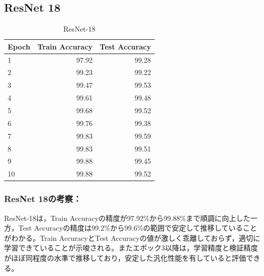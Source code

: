 \documentclass[a4paper,11pt,titlepage]{jsarticle}
\begin{document}
\subsection{ResNet 18}
\begin{table}[H]
\centering
\caption{ResNet-18}
\label{tab:ResNet18}
\begin{tabular}{lrr}
\hline
 Epoch &  Train Accuracy &  Test Accuracy \\
\hline
     1 &           97.92 &                99.28 \\
     2 &           99.23 &                99.22 \\
     3 &           99.47 &                99.53 \\
     4 &           99.61 &                99.48 \\
     5 &           99.68 &                99.52 \\
     6 &           99.76 &                99.38 \\
     7 &           99.83 &                99.59 \\
     8 &           99.83 &                99.51 \\
     9 &           99.88 &                99.45 \\
    10 &           99.88 &                99.52 \\
\hline
\end{tabular}
\end{table}



\subsubsection*{ResNet 18の考察：}
ResNet-18は，Train Accuracyの精度が97.92\%から99.88\%まで順調に向上した一方，Test Accuracyの精度は99.2\%から99.6\%の範囲で安定して推移していることがわかる。Train AccuracyとTest Accuracyの値が激しく乖離しておらず，適切に学習できていることが示唆される。またエポック3以降は，学習精度と検証精度がほぼ同程度の水準で推移しており，安定した汎化性能を有していると評価できる。
\end{document}
